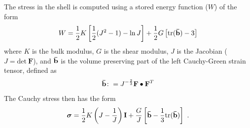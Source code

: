       The stress in the shell is computed using a stored energy function ($W$)
      of the form
      \begin{equation}
        W = \frac{1}{2}K\left[\frac{1}{2}(J^2-1) - \ln J\right] +
            \frac{1}{2}G \left[\text{tr}(\boldsymbol{\Bar{\mathbf{b}}})-3\right]
      \end{equation}
      where $K$ is the bulk modulus, $G$ is the shear modulus, $J$ is
      the Jacobian ($J = \text{det}~\mathbf{F}$), 
      and $\boldsymbol{\Bar{\mathbf{b}}}$ is the 
      volume preserving part of the left Cauchy-Green strain tensor, defined as
      \begin{equation}
        \boldsymbol{\Bar{\mathbf{b}}} \colon= J^{-\frac{2}{3}} 
          \mathbf{F}\bullet\mathbf{F}^T
      \end{equation}
      The Cauchy stress then has the form
      \begin{equation}
        \boldsymbol{\sigma} = \frac{1}{2}K\left(J-\frac{1}{J}\right)\mathbf{I} +
           \frac{G}{J}\left[\boldsymbol{\Bar{\mathbf{b}}} - 
             \frac{1}{3}\text{tr}(\boldsymbol{\Bar{\mathbf{b}}})\right]~.
           \label{eq:elastic}
      \end{equation}

